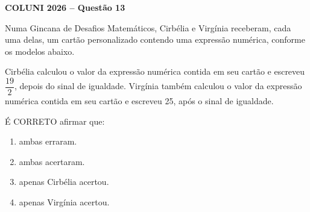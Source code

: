 \textbf{COLUNI 2026 -- Questão 13}\par\medskip Numa Gincana de Desafios Matemáticos, Cirbélia e Virgínia receberam, cada uma delas, um cartão personalizado contendo uma expressão numérica, conforme os modelos abaixo.

\begin{center}
\hfill
{}
\end{center}

Cirbélia calculou o valor da expressão numérica contida em seu cartão e escreveu $\dfrac{19}{2}$, depois do sinal de igualdade. Virgínia também calculou o valor da expressão numérica contida em seu cartão e escreveu 25, após o sinal de igualdade.

É CORRETO afirmar que:
\begin{enumerate}
\item ambas erraram.
\item ambas acertaram.
\item apenas Cirbélia acertou.
\item apenas Virgínia acertou.
\end{enumerate}
